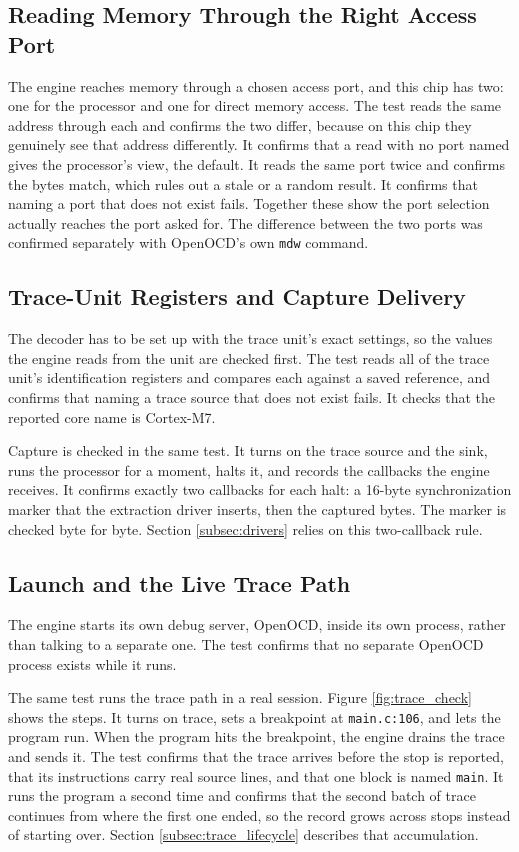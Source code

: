 \subsection{Reading Memory Through the Right Access Port}
The engine reaches memory through a chosen access port, and this chip has two: one for the processor and one for direct memory access. The test reads the same address through each and confirms the two differ, because on this chip they genuinely see that address differently. It confirms that a read with no port named gives the processor's view, the default. It reads the same port twice and confirms the bytes match, which rules out a stale or a random result. It confirms that naming a port that does not exist fails. Together these show the port selection actually reaches the port asked for. The difference between the two ports was confirmed separately with OpenOCD's own \texttt{mdw} command.

\subsection{Trace-Unit Registers and Capture Delivery}
The decoder has to be set up with the trace unit's exact settings, so the values the engine reads from the unit are checked first. The test reads all of the trace unit's identification registers and compares each against a saved reference, and confirms that naming a trace source that does not exist fails. It checks that the reported core name is Cortex-M7.

Capture is checked in the same test. It turns on the trace source and the sink, runs the processor for a moment, halts it, and records the callbacks the engine receives. It confirms exactly two callbacks for each halt: a 16-byte synchronization marker that the extraction driver inserts, then the captured bytes. The marker is checked byte for byte. Section \ref{subsec:drivers} relies on this two-callback rule.

\subsection{Launch and the Live Trace Path}
\label{subsec:launch_check}
The engine starts its own debug server, OpenOCD, inside its own process, rather than talking to a separate one. The test confirms that no separate OpenOCD process exists while it runs.

The same test runs the trace path in a real session. Figure \ref{fig:trace_check} shows the steps. It turns on trace, sets a breakpoint at \texttt{main.c:106}, and lets the program run. When the program hits the breakpoint, the engine drains the trace and sends it. The test confirms that the trace arrives before the stop is reported, that its instructions carry real source lines, and that one block is named \texttt{main}. It runs the program a second time and confirms that the second batch of trace continues from where the first one ended, so the record grows across stops instead of starting over. Section \ref{subsec:trace_lifecycle} describes that accumulation.

